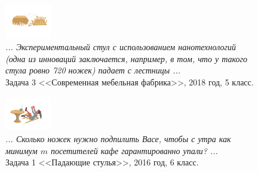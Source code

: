 \documentclass[10pt]{scrbook} \usepackage{modules/nonstahp_book}
\begin{document}
\begin{figure} \begin{center}
	\includegraphics[width=2cm]{figures/color/01}
	\caption{
             {\itshape ... Экспериментальный стул с использованием нанотехнологий 
             (одна из инноваций заключается, например, в том, что у 
             такого стула ровно 720 ножек) падает с лестницы ...}\\
             {Задача 3 <<Современная мебельная фабрика>>, 2018 год, 5 класс.}}
\end{center} \end{figure}

\begin{figure} \begin{center}
	\includegraphics[width=2cm]{figures/color/05}
	\caption{
             {\itshape ... Сколько ножек нужно подпилить Васе, 
              чтобы с утра как минимум $m$ посетителей кафе гарантированно упали? ...}\\
             {Задача 1 <<Падающие стулья>>, 2016 год, 6 класс.}}
\end{center} \end{figure}
\end{document}
